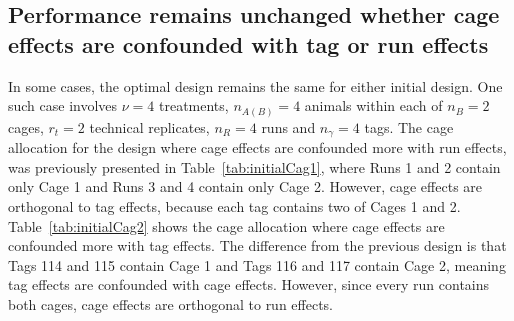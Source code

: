 \subsection{Performance remains unchanged whether cage effects are confounded with tag or run effects}
In some cases, the optimal design remains the same for either initial design. One such case involves $\nu = 4$ treatments, $n_{A(B)} = 4$ animals within each of $n_B = 2$ cages, $r_t = 2$ technical replicates, $n_R = 4$ runs and $n_\gamma = 4$ tags. The cage allocation for the design where cage effects are confounded more with run effects, was previously presented in Table~\ref{tab:initialCag1}, where Runs 1 and 2 contain only Cage 1 and Runs 3 and 4 contain only Cage 2. However, cage effects are orthogonal to tag effects, because each tag contains two of Cages 1 and 2. Table~\ref{tab:initialCag2} shows the cage allocation where cage effects are confounded more with tag effects. The difference from the previous design is that Tags 114 and 115 contain Cage 1 and Tags 116 and 117 contain Cage 2, meaning tag effects are confounded with cage effects. However, since every run contains both cages, cage effects are orthogonal to run effects. 

